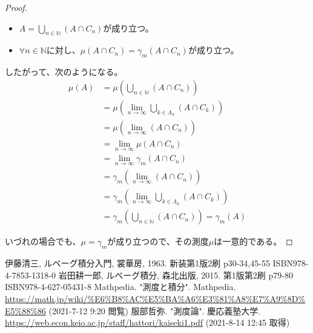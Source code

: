 \documentclass[dvipdfmx]{jsarticle}
\begin{document}
\begin{proof}
\begin{itemize}
\item
  $A = \bigcup_{n \in \mathbb{N}} \left( A \cap C_{n} \right)$が成り立つ。
\item
  $\forall n \in \mathbb{N}$に対し、$\mu\left( A \cap C_{n} \right) = \gamma_{m}\left( A \cap C_{n} \right)$が成り立つ。
\end{itemize}
したがって、次のようになる。
\begin{align*}
\mu(A) &= \mu\left( \bigcup_{n \in \mathbb{N}} \left( A \cap C_{n} \right) \right)\\
&= \mu\left( \lim_{n \rightarrow \infty}{\bigcup_{k \in \varLambda_{n}} \left( A \cap C_{k} \right)} \right)\\
&= \mu\left( \lim_{n \rightarrow \infty}\left( A \cap C_{n} \right) \right)\\
&= \lim_{n \rightarrow \infty}{\mu\left( A \cap C_{n} \right)}\\
&= \lim_{n \rightarrow \infty}{\gamma_{m}\left( A \cap C_{n} \right)}\\
&= \gamma_{m}\left( \lim_{n \rightarrow \infty}\left( A \cap C_{n} \right) \right)\\
&= \gamma_{m}\left( \lim_{n \rightarrow \infty}{\bigcup_{k \in \varLambda_{n}} \left( A \cap C_{k} \right)} \right)\\
&= \gamma_{m}\left( \bigcup_{n \in \mathbb{N}} \left( A \cap C_{n} \right) \right) = \gamma_{m}(A)
\end{align*}\par
いづれの場合でも、$\mu = \gamma_{m}$が成り立つので、その測度$\mu$は一意的である。
\end{proof}
\begin{thebibliography}{50}
    伊藤清三, ルベーグ積分入門, 裳華房, 1963. 新装第1版2刷 p30-34,45-55 ISBN978-4-7853-1318-0
    岩田耕一郎, ルベーグ積分, 森北出版, 2015. 第1版第2刷 p79-80 ISBN978-4-627-05431-8
    Mathpedia. "測度と積分". Mathpedia. \url{https://math.jp/wiki/%E6%B8%AC%E5%BA%A6%E3%81%A8%E7%A9%8D%E5%88%86} (2021-7-12 9:20 閲覧)
    服部哲弥. "測度論". 慶応義塾大学. \url{https://web.econ.keio.ac.jp/staff/hattori/kaiseki1.pdf} (2021-8-14 12:45 取得)
\end{thebibliography}
\end{document}
